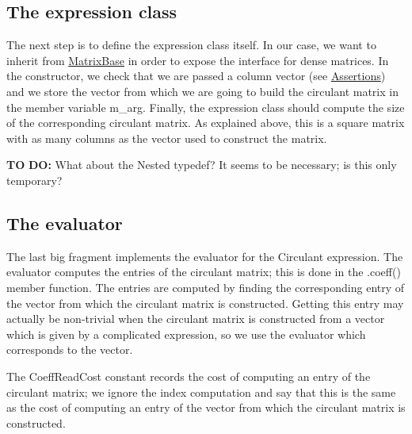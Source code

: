 \begin{DoxyCodeInclude}
\end{DoxyCodeInclude}
\hypertarget{_topic_new_expression_type_TopicExpression}{}\subsection{The expression class}\label{_topic_new_expression_type_TopicExpression}
The next step is to define the expression class itself. In our case, we want to inherit from {\ttfamily \hyperlink{group___core___module_class_eigen_1_1_matrix_base}{Matrix\+Base}} in order to expose the interface for dense matrices. In the constructor, we check that we are passed a column vector (see \hyperlink{TopicAssertions}{Assertions}) and we store the vector from which we are going to build the circulant matrix in the member variable {\ttfamily m\+\_\+arg}. Finally, the expression class should compute the size of the corresponding circulant matrix. As explained above, this is a square matrix with as many columns as the vector used to construct the matrix.

{\bfseries TO} {\bfseries DO\+:} What about the {\ttfamily Nested} typedef? It seems to be necessary; is this only temporary?


\begin{DoxyCodeInclude}
\end{DoxyCodeInclude}
\hypertarget{_topic_new_expression_type_TopicEvaluator}{}\subsection{The evaluator}\label{_topic_new_expression_type_TopicEvaluator}
The last big fragment implements the evaluator for the {\ttfamily Circulant} expression. The evaluator computes the entries of the circulant matrix; this is done in the {\ttfamily }.coeff() member function. The entries are computed by finding the corresponding entry of the vector from which the circulant matrix is constructed. Getting this entry may actually be non-\/trivial when the circulant matrix is constructed from a vector which is given by a complicated expression, so we use the evaluator which corresponds to the vector.

The {\ttfamily Coeff\+Read\+Cost} constant records the cost of computing an entry of the circulant matrix; we ignore the index computation and say that this is the same as the cost of computing an entry of the vector from which the circulant matrix is constructed.

